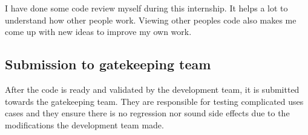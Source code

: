 I have done some code review myself during this internship. It helps a lot to
understand how other people work. Viewing other peoples code also makes me come
up with new ideas to improve my own work.

\subsection{Submission to gatekeeping team}
After the code is ready and validated by the development team, it is submitted towards the gatekeeping team.
They are responsible for testing complicated uses cases and they ensure there is no regression nor sound side effects
due to the modifications the development team made.

